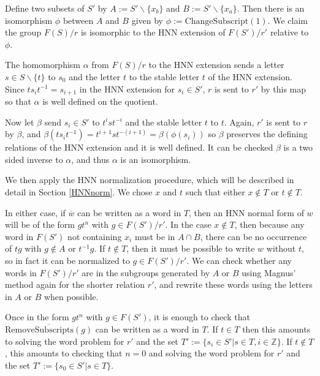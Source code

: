 \documentclass[11pt]{article} %
\theoremstyle{definition}
\theoremstyle{definition}
\theoremstyle{definition}
\theoremstyle{definition}
\theoremstyle{definition}
\theoremstyle{definition}
\begin{document}
Define two subsets of $S'$ by $A := S' \backslash \{x_b\}$ and $B := S' \backslash \{x_a\}$.
Then there is an isomorphism $\phi$ between $A$ and $B$ given by
$\phi := \text{ChangeSubscript}(1)$.
We claim the group $F(S) / r$ is isomorphic to the HNN extension of $F(S') / r'$ relative to $\phi$.

The homomorphism $\alpha$ from $F(S)/r$ to the HNN extension sends a letter
$s \in S \backslash \{t\}$ to $s_0$ and
the letter $t$ to the stable letter $t$ of the HNN extension. Since $t s_i t^{-1} = s_{i+1}$ in
the HNN extension for $s_i \in S'$, $r$ is sent to $r'$ by this map so that $\alpha$ is well defined
on the quotient.

Now let $\beta$ send $s_i \in S'$ to $t^{i} s t^{-i}$ and the stable letter $t$ to $t$.
Again, $r'$ is sent to $r$ by $\beta$, and $\beta (t s_i t^{-1}) = t^{i+1} s t^{-(i+1)} =
\beta (\phi (s_i))$ so $\beta$ preserves the defining relations of the HNN extension and it
is well defined. It can be checked $\beta$ is a two sided inverse to $\alpha$, and thus $\alpha$
is an isomorphism.

We then apply the HNN normalization procedure, which will be described in detail in Section
\ref{HNNnorm}. We chose $x$ and $t$ such that either $x \notin T$ or $t \notin T$.

In either case, if $\overline{w}$ can be written as a word in $T$,
then an HNN normal form of $w$ will be of the form $g t^n$
with $g \in F(S') / r'$. In the case $x \notin T$, then because any word in
$F(S')$ not containing $x_i$ must be in $A \cap B$, there can be no occurrence of
$tg$ with $g \notin A$ or $t^{-1}g.$
If $t \notin T$, then it must be possible to write $w$ without $t$, so in fact it can be normalized
to $g \in F(S') / r'$. We can check whether any words in $F(S') / r'$ are in the subgroups
generated by $A$ or $B$ using
Magnus' method again for the shorter relation $r'$, and rewrite these words using the letters
in $A$ or $B$ when possible.

Once in the form $g t^n$ with $g \in F(S')$, it is enough to check that \newline
$\overline{\text{RemoveSubscripts}(g)}$ can be written as a word in $T$.
If $t \in T$ then this amounts to solving the word problem for $r'$
and the set $T' := \{ s_i \in S' | s \in T, i \in \mathbb{Z} \}$. If $t \notin T$,
this amounts to checking that $n = 0$ and solving the word problem for
$r'$ and the set $T' := \{s_0 \in S' | s \in T\}$.\\
\end{document}
